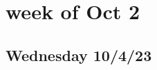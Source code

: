 \documentclass[12pt]{article}
\begin{document}
    \tableofcontents \newpage
    \section{week of Oct 2}
    \subsection{Wednesday 10/4/23}
       \bigskip
        
       


\end{document}
